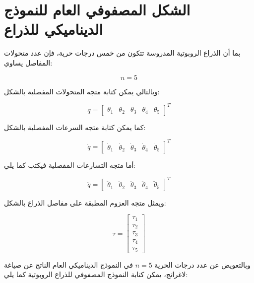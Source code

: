 \section{الشكل المصفوفي العام للنموذج الديناميكي للذراع }


بما أن الذراع الروبوتية المدروسة تتكون من خمس درجات حرية، فإن عدد متحولات المفاصل يساوي:

\begin{equation}
n = 5
\end{equation}

وبالتالي يمكن كتابة متجه المتحولات المفصلية بالشكل:

\begin{equation}
q =
\begin{bmatrix}
\theta_1 &
\theta_2 &
\theta_3 &
\theta_4 &
\theta_5
\end{bmatrix}^{T}
\end{equation}

كما يمكن كتابة متجه السرعات المفصلية بالشكل:

\begin{equation}
\dot{q} =
\begin{bmatrix}
\dot{\theta}_1 &
\dot{\theta}_2 &
\dot{\theta}_3 &
\dot{\theta}_4 &
\dot{\theta}_5
\end{bmatrix}^{T}
\end{equation}

أما متجه التسارعات المفصلية فيكتب كما يلي:

\begin{equation}
\ddot{q} =
\begin{bmatrix}
\ddot{\theta}_1 &
\ddot{\theta}_2 &
\ddot{\theta}_3 &
\ddot{\theta}_4 &
\ddot{\theta}_5
\end{bmatrix}^{T}
\end{equation}

ويمثل متجه العزوم المطبقة على مفاصل الذراع بالشكل:

\begin{equation}
\tau =
\begin{bmatrix}
\tau_1 \\
\tau_2 \\
\tau_3 \\
\tau_4 \\
\tau_5
\end{bmatrix}
\end{equation}

وبالتعويض عن عدد درجات الحرية $n=5$ في النموذج الديناميكي العام الناتج عن صياغة لاغرانج، يمكن كتابة النموذج المصفوفي للذراع الروبوتية كما يلي:

